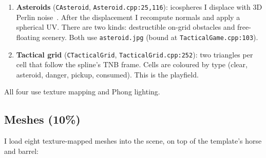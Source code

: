 \documentclass[11pt,a4paper]{article}
\begin{document}
\begin{enumerate}
\begin{itemize}
                $\sin(\pi t_\mathrm{unfurl})\cdot\sin(\pi s)\sin(\pi t)$,
                where $t_\mathrm{unfurl}\in[0,1]$ is the per-vertex deploy
                progress. It peaks halfway through the deploy and goes back
                to zero at the start and end, so the cloth looks slack in
                the middle of the unfurl instead of just stretching out
                rigidly.
        \end{itemize}
        The fragment shader also adds a broad iridescent specular term
        using \texttt{iridescent.png}.
  \item \textbf{Asteroids} (\texttt{CAsteroid},
        \texttt{Asteroid.cpp:25,116}): icospheres I displace with 3D Perlin
        noise~\cite{perlin2002}. After the displacement I recompute normals
        and apply a spherical UV. There are two kinds: destructible on-grid
        obstacles and free-floating scenery. Both use \texttt{asteroid.jpg}
        (bound at \texttt{TacticalGame.cpp:103}).
  \item \textbf{Tactical grid} (\texttt{CTacticalGrid},
        \texttt{TacticalGrid.cpp:252}): two triangles per cell that follow the
        spline's TNB frame. Cells are coloured by type (clear, asteroid,
        danger, pickup, consumed). This is the playfield.
\end{enumerate}

All four use texture mapping and Phong lighting.


\subsection{Meshes (10\%)}

I load eight texture-mapped meshes into the scene, on top of the template's
horse and barrel:
\end{document}
